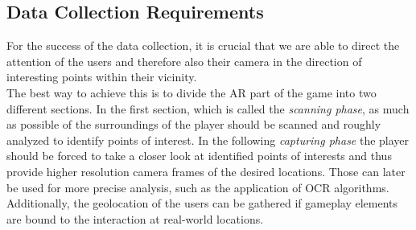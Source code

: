 \subsection{Data Collection Requirements}
\label{subsec:collectingdata}

For the success of the data collection, it is crucial that we are able to direct the attention of the users and therefore also their camera in the direction of interesting points within their vicinity.\\
The best way to achieve this is to divide the AR part of the game into two different sections.
In the first section, which is called the \emph{scanning phase}, as much as possible of the surroundings of the player should be scanned and roughly analyzed to identify points of interest.
In the following \emph{capturing phase} the player should be forced to take a closer look at identified points of interests and thus provide higher resolution camera frames of the desired locations.
Those can later be used for more precise analysis, such as the application of OCR algorithms.\\
Additionally, the geolocation of the users can be gathered if gameplay elements are bound to the interaction at real-world locations.


